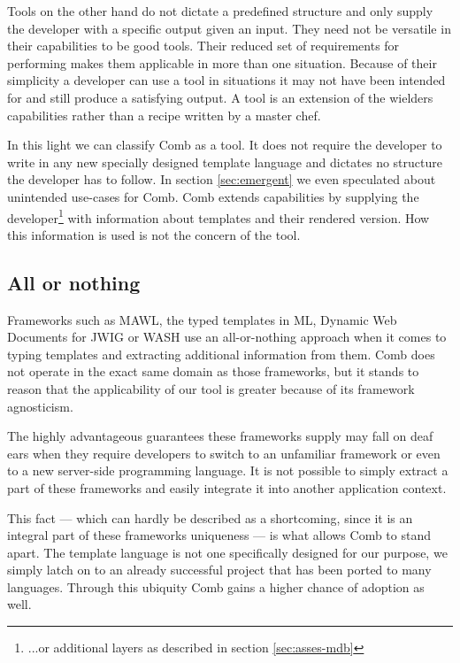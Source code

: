 \documentclass[thesis.tex]{subfiles}
\begin{document}
Tools on the other hand do not dictate a predefined structure and only supply
the developer with a specific output given an input. They need not be versatile
in their capabilities to be good tools. Their reduced set of requirements for
performing makes them applicable in more than one situation. Because of their
simplicity a developer can use a tool in situations it may not have been
intended for and still produce a satisfying output. A tool is an extension of
the wielders capabilities rather than a recipe written by a master chef.

In this light we can classify Comb as a tool. It does not require the developer
to write in any new specially designed template language and dictates no
structure the developer has to follow. In section \ref{sec:emergent} we even
speculated about unintended use-cases for Comb. Comb extends capabilities by
supplying the developer\footnote{...or additional layers as described in
section \ref{sec:asses-mdb}} with information about templates and their
rendered version. How this information is used is not the concern of the tool.


\subsection{All or nothing}
Frameworks such as MAWL, the typed templates in ML, Dynamic Web
Documents \cite{DYNDOC} for JWIG or WASH \cite{WASH} use an all-or-nothing
approach when it comes to typing templates and extracting additional information
from them.
Comb does not operate in the exact same domain as those frameworks, but it
stands to reason that the applicability of our tool is greater because of its
framework agnosticism.

The highly advantageous guarantees these frameworks supply may fall on deaf ears
when they require developers to switch to an unfamiliar framework or even to
a new server-side programming language. It is not possible to simply extract a
part of these frameworks and easily integrate it into another application
context.

This fact --- which can hardly be described as a shortcoming, since it is an
integral part of these frameworks uniqueness --- is what allows Comb to stand
apart. The template language is not one specifically designed for our purpose,
we simply latch on to an already successful project that has been ported to many
languages. Through this ubiquity Comb gains a higher chance of adoption as well.
\end{document}

